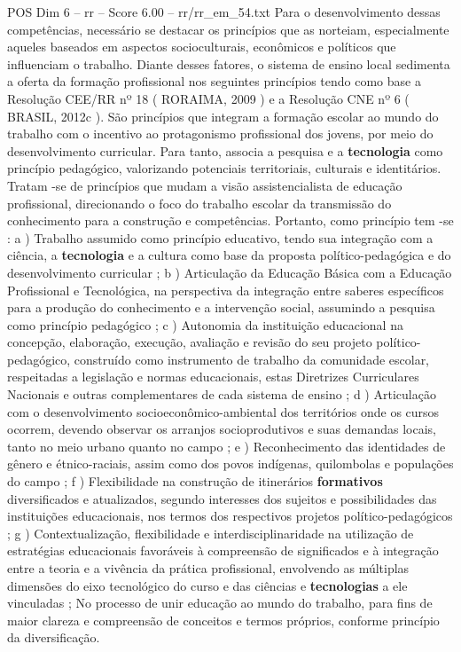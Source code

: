 \begin{textsample}{POS Dim 6 – rr – Score 6.00 – rr/rr\_em\_54.txt}
Para o desenvolvimento dessas competências, necessário se destacar os princípios que as norteiam, especialmente aqueles baseados em aspectos socioculturais, econômicos e políticos que influenciam o trabalho.
Diante desses fatores, o sistema de ensino local sedimenta a oferta da formação profissional nos seguintes princípios tendo como base a Resolução CEE/RR nº 18 ( RORAIMA, 2009 ) e a Resolução CNE nº 6 ( BRASIL, 2012c ).
São princípios que integram a formação escolar ao mundo do trabalho com o incentivo ao protagonismo profissional dos jovens, por meio do desenvolvimento curricular.
Para tanto, associa a pesquisa e a \textbf{tecnologia} como princípio pedagógico, valorizando potenciais territoriais, culturais e identitários.
Tratam -se de princípios que mudam a visão assistencialista de educação profissional, direcionando o foco do trabalho escolar da transmissão do conhecimento para a construção e competências.
Portanto, como princípio tem -se : a ) Trabalho assumido como princípio educativo, tendo sua integração com a ciência, a \textbf{tecnologia} e a cultura como base da proposta político-pedagógica e do desenvolvimento curricular ; b ) Articulação da Educação Básica com a Educação Profissional e Tecnológica, na perspectiva da integração entre saberes específicos para a produção do conhecimento e a intervenção social, assumindo a pesquisa como princípio pedagógico ; c ) Autonomia da instituição educacional na concepção, elaboração, execução, avaliação e revisão do seu projeto político-pedagógico, construído como instrumento de trabalho da comunidade escolar, respeitadas a legislação e normas educacionais, estas Diretrizes Curriculares Nacionais e outras complementares de cada sistema de ensino ; d ) Articulação com o desenvolvimento socioeconômico-ambiental dos territórios onde os cursos ocorrem, devendo observar os arranjos socioprodutivos e suas demandas locais, tanto no meio urbano quanto no campo ; e ) Reconhecimento das identidades de gênero e étnico-raciais, assim como dos povos indígenas, quilombolas e populações do campo ; f ) Flexibilidade na construção de itinerários \textbf{formativos} diversificados e atualizados, segundo interesses dos sujeitos e possibilidades das instituições educacionais, nos termos dos respectivos projetos político-pedagógicos ; g ) Contextualização, flexibilidade e interdisciplinaridade na utilização de estratégias educacionais favoráveis à compreensão de significados e à integração entre a teoria e a vivência da prática profissional, envolvendo as múltiplas dimensões do eixo tecnológico do curso e das ciências e \textbf{tecnologias} a ele vinculadas ; No processo de unir educação ao mundo do trabalho, para fins de maior clareza e compreensão de conceitos e termos próprios, conforme princípio da diversificação.

\end{textsample}
